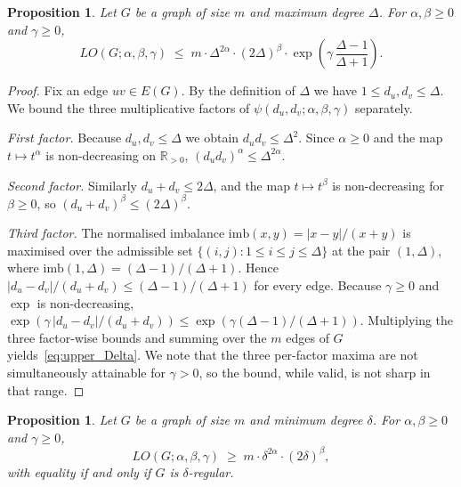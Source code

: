 \documentclass[a5paper, 10pt]{article}
\theoremstyle{plain}
\newtheorem{proposition}[theorem]{Proposition}
\theoremstyle{remark}
\theoremstyle{definition}
\newcommand{\Wuzi}{LO(G;\alpha,\beta,\gamma)}
\begin{document}
  \begin{proposition}\label{thm:upper_Delta}
  Let $G$ be a graph of size $m$ and maximum degree $\Delta$. For
  $\alpha, \beta \ge 0$ and $\gamma \ge 0$,
  \begin{equation}\label{eq:upper_Delta}
  \Wuzi \;\le\; m \cdot \Delta^{2\alpha} \cdot (2\Delta)^{\beta}
  \cdot \exp\!\left(\gamma\,\frac{\Delta - 1}{\Delta + 1}\right).
  \end{equation}
  \end{proposition}

  \begin{proof}
  Fix an edge $uv \in E(G)$. By the definition of $\Delta$ we have
  $1 \le d_u, d_v \le \Delta$. We bound the three multiplicative
  factors of $\psi(d_u, d_v; \alpha, \beta, \gamma)$ separately.

  \emph{First factor.} Because $d_u, d_v \le \Delta$ we obtain
  $d_u d_v \le \Delta^{2}$. Since $\alpha \ge 0$ and the map
  $t \mapsto t^{\alpha}$ is non-decreasing on $\mathbb{R}_{> 0}$,
  $(d_u d_v)^{\alpha} \le \Delta^{2\alpha}$.

  \emph{Second factor.} Similarly $d_u + d_v \le 2\Delta$, and the
  map $t \mapsto t^{\beta}$ is non-decreasing for $\beta \ge 0$, so
  $(d_u + d_v)^{\beta} \le (2\Delta)^{\beta}$.

  \emph{Third factor.} The normalised imbalance
  $\mathrm{imb}(x, y) = |x - y|/(x + y)$ is maximised over the
  admissible set $\{(i, j) : 1 \le i \le j \le \Delta\}$ at the
  pair $(1, \Delta)$, where
  $\mathrm{imb}(1, \Delta) = (\Delta - 1)/(\Delta + 1)$. Hence
  $|d_u - d_v|/(d_u + d_v) \le (\Delta - 1)/(\Delta + 1)$ for every
  edge. Because $\gamma \ge 0$ and $\exp$ is non-decreasing,
  $\exp(\gamma\,|d_u - d_v|/(d_u + d_v)) \le \exp(\gamma(\Delta - 1)/(\Delta + 1))$.
  Multiplying the three factor-wise bounds and summing over the
  $m$ edges of $G$ yields~\eqref{eq:upper_Delta}. We note that the
  three per-factor maxima are not simultaneously attainable for
  $\gamma > 0$, so the bound, while valid, is not sharp in that range.
  \end{proof}

  \begin{proposition}\label{thm:lower_delta}
  Let $G$ be a graph of size $m$ and minimum degree $\delta$. For
  $\alpha, \beta \ge 0$ and $\gamma \ge 0$,
  \begin{equation}\label{eq:lower_delta}
  \Wuzi \;\ge\; m \cdot \delta^{2\alpha} \cdot (2\delta)^{\beta},
  \end{equation}
  with equality if and only if $G$ is $\delta$-regular.
  \end{proposition}
\end{document}
